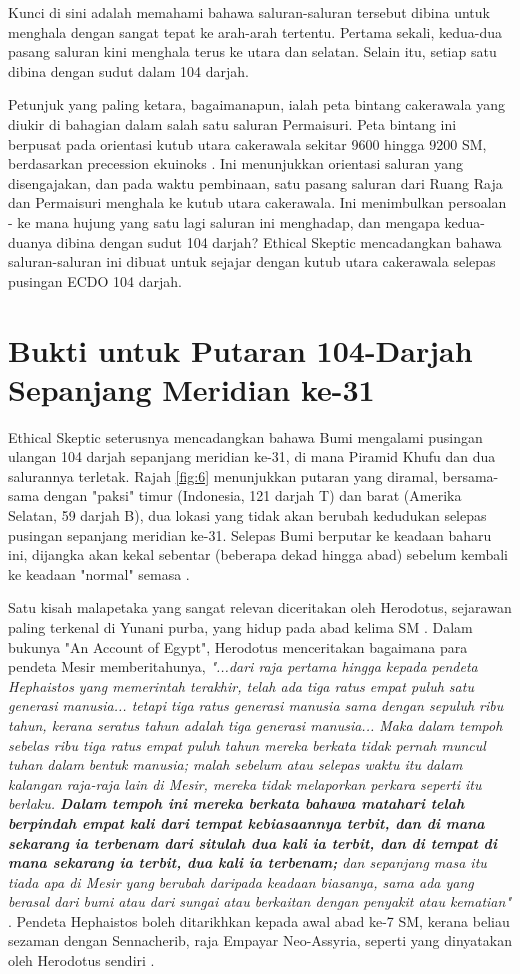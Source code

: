 \documentclass[10pt,twocolumn,letterpaper]{article}
\begin{document}
Kunci di sini adalah memahami bahawa saluran-saluran tersebut dibina untuk menghala dengan sangat tepat ke arah-arah tertentu. Pertama sekali, kedua-dua pasang saluran kini menghala terus ke utara dan selatan. Selain itu, setiap satu dibina dengan sudut dalam 104 darjah.

Petunjuk yang paling ketara, bagaimanapun, ialah peta bintang cakerawala yang diukir di bahagian dalam salah satu saluran Permaisuri. Peta bintang ini berpusat pada orientasi kutub utara cakerawala sekitar 9600 hingga 9200 SM, berdasarkan precession ekuinoks \cite{28}. Ini menunjukkan orientasi saluran yang disengajakan, dan pada waktu pembinaan, satu pasang saluran dari Ruang Raja dan Permaisuri menghala ke kutub utara cakerawala. Ini menimbulkan persoalan - ke mana hujung yang satu lagi saluran ini menghadap, dan mengapa kedua-duanya dibina dengan sudut 104 darjah? Ethical Skeptic mencadangkan bahawa saluran-saluran ini dibuat untuk sejajar dengan kutub utara cakerawala selepas pusingan ECDO 104 darjah.

\section{Bukti untuk Putaran 104-Darjah Sepanjang Meridian ke-31}

Ethical Skeptic seterusnya mencadangkan bahawa Bumi mengalami pusingan ulangan 104 darjah sepanjang meridian ke-31, di mana Piramid Khufu dan dua salurannya terletak. Rajah \ref{fig:6} menunjukkan putaran yang diramal, bersama-sama dengan "paksi" timur (Indonesia, 121 darjah T) dan barat (Amerika Selatan, 59 darjah B), dua lokasi yang tidak akan berubah kedudukan selepas pusingan sepanjang meridian ke-31. Selepas Bumi berputar ke keadaan baharu ini, dijangka akan kekal sebentar (beberapa dekad hingga abad) sebelum kembali ke keadaan "normal" semasa \cite{150}.

Satu kisah malapetaka yang sangat relevan diceritakan oleh Herodotus, sejarawan paling terkenal di Yunani purba, yang hidup pada abad kelima SM \cite{31}. Dalam bukunya "An Account of Egypt", Herodotus menceritakan bagaimana para pendeta Mesir memberitahunya, \textit{"...dari raja pertama hingga kepada pendeta Hephaistos yang memerintah terakhir, telah ada tiga ratus empat puluh satu generasi manusia... tetapi tiga ratus generasi manusia sama dengan sepuluh ribu tahun, kerana seratus tahun adalah tiga generasi manusia... Maka dalam tempoh sebelas ribu tiga ratus empat puluh tahun mereka berkata tidak pernah muncul tuhan dalam bentuk manusia; malah sebelum atau selepas waktu itu dalam kalangan raja-raja lain di Mesir, mereka tidak melaporkan perkara seperti itu berlaku. \textbf{Dalam tempoh ini mereka berkata bahawa matahari telah berpindah empat kali dari tempat kebiasaannya terbit, dan di mana sekarang ia terbenam dari situlah dua kali ia terbit, dan di tempat di mana sekarang ia terbit, dua kali ia terbenam;} dan sepanjang masa itu tiada apa di Mesir yang berubah daripada keadaan biasanya, sama ada yang berasal dari bumi atau dari sungai atau berkaitan dengan penyakit atau kematian"} \cite{32}. Pendeta Hephaistos boleh ditarikhkan kepada awal abad ke-7 SM, kerana beliau sezaman dengan Sennacherib, raja Empayar Neo-Assyria, seperti yang dinyatakan oleh Herodotus sendiri \cite{32,33,34}.
\end{document}
